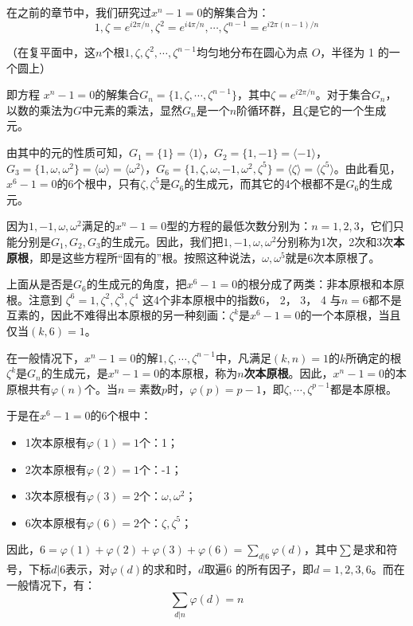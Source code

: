 \documentclass[12pt]{article}
\begin{document}
在之前的章节中，我们研究过$x^n - 1 = 0$的解集合为：
$$
1, \zeta = e^{i2\pi/n}, \zeta^2 = e^{i4\pi/n}, \cdots,  \zeta^{n-1} = e^{i2\pi(n-1)/n}
$$

（在复平面中，这$n$个根$1, \zeta, \zeta^2, \cdots, \zeta^{n-1}$均匀地分布在圆心为点 $O$，半径为 1 的一个圆上）

即方程 $x^n-1=0$的解集合$G_n = \{1, \zeta, \cdots, \zeta^{n-1}\}$，其中$\zeta = e^{i2\pi/n}$。对于集合$G_n$，以数的乘法为$G$中元素的乘法，显然$G_n$是一个$n$阶循环群，且$\zeta$是它的一个生成元。

由其中的元的性质可知，$G_1 = \{1\} = \langle 1 \rangle$，$G_2 = \{1, -1\} = \langle -1 \rangle$，$G_3 = \{1, \omega, \omega^2\} = \langle \omega \rangle = \langle \omega^2 \rangle$，$G_6 = \{1, \zeta, \omega, -1, \omega^2, \zeta^5\} = \langle \zeta \rangle = \langle \zeta^5 \rangle$。由此看见，$x^6-1=0$的6个根中，只有$\zeta, \zeta^5$是$G_6$的生成元，而其它的4个根都不是$G_6$的生成元。

因为$1, -1, \omega, \omega^2$满足的$x^n-1=0$型的方程的最低次数分别为：$n = 1, 2, 3$，它们只能分别是$G_1, G_2, G_3$的生成元。因此，我们把$1, -1, \omega, \omega^2$分别称为1次，2次和3次\textbf{本原根}，即是这些方程所“固有的”根。按照这种说法，$\omega, \omega^5$就是6次本原根了。

上面从是否是$G_6$的生成元的角度，把$x^6-1=0$的根分成了两类：非本原根和本原根。注意到 $\zeta^6=1, \zeta^2, \zeta^3, \zeta^4$ 这4个非本原根中的指数6， 2， 3， 4 与$n=6$都不是互素的，因此不难得出本原根的另一种刻画：$\zeta^k$是$x^6 - 1 = 0$的一个本原根，当且仅当$(k,6) = 1$。

在一般情况下，$x^n-1=0$的解$1, \zeta, \cdots, \zeta^{n-1}$中，凡满足$(k,n) = 1$的$k$所确定的根$\zeta^k$是$G_n$的生成元，是$x^n-1=0$的本原根，称为\textbf{$n$次本原根}。因此，$x^n-1=0$的本原根共有$\varphi(n)$个。当$n=$素数$p$时，$\varphi(p) = p - 1$，即$\zeta, \cdots, \zeta^{p-1}$都是本原根。

于是在$x^6-1=0$的6个根中：
\begin{itemize}
\setlength{\itemsep}{0pt}
\setlength{\parsep}{0pt}
\setlength{\parskip}{0pt}
	\item 1次本原根有$\varphi(1) = 1$个：1；
	\item 2次本原根有$\varphi(2) = 1$个：-1；
	\item 3次本原根有$\varphi(3) = 2$个：$\omega, \omega^2$；
	\item 6次本原根有$\varphi(6) = 2$个：$\zeta, \zeta^5$；
\end{itemize}

因此，$6 = \varphi(1) + \varphi(2) + \varphi(3) + \varphi(6) = \sum_{d|6}\varphi(d)$，其中$\sum$是求和符号，下标$d|6$表示，对$\varphi(d)$的求和时，$d$取遍6 的所有因子，即$d = 1, 2, 3, 6$。而在一般情况下，有：
$$
\sum_{d|n} \varphi(d) = n
$$
\end{document}

